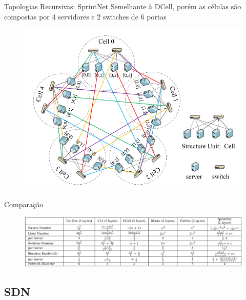 \documentclass[aspectratio=169]{beamer}
\begin{document}
		\begin{frame} {Topologias Recursivas: SprintNet}
			Semelhante à DCell, porém as células são compostas por 4 servidores e 2 switches de 6 portas
			\begin{figure}[ht]    
				\includegraphics[scale=0.3]{imagens/springnet.png}
				\label{fig:sample_figure}
			\end{figure}
		\end{frame}

		\begin{frame} {Comparação}
			\begin{figure}[ht]   
				\includegraphics[scale=0.35]{imagens/tabela.png}
				\label{fig:sample_figure}
			\end{figure}
		\end{frame}

		\subsection{SDN}
		
\end{document}
